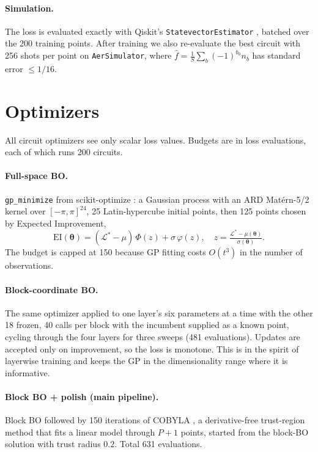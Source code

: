 \documentclass[10pt,twocolumn]{article}
\newcommand{\btheta}{\bm{\theta}}
\begin{document}
\paragraph{Simulation.} The loss is evaluated exactly with Qiskit's
\texttt{StatevectorEstimator} \citep{qiskit2024}, batched over the 200 training
points. After training we also re-evaluate the best circuit with 256 shots per
point on \texttt{AerSimulator}, where $\hat f=\frac1S\sum_b(-1)^{b_0}n_b$ has
standard error $\le 1/16$.

\section{Optimizers}

All circuit optimizers see only scalar loss values. Budgets are in loss
evaluations, each of which runs 200 circuits.

\paragraph{Full-space BO.} \texttt{gp\_minimize} from scikit-optimize
\citep{skopt}: a Gaussian process with an ARD Mat\'ern-5/2 kernel over
$[-\pi,\pi]^{24}$, 25 Latin-hypercube initial points, then 125 points chosen by
Expected Improvement,
\begin{equation}
\mathrm{EI}(\btheta)=(\mathcal L^*-\mu)\,\Phi(z)+\sigma\,\varphi(z),\quad
z=\tfrac{\mathcal L^*-\mu(\btheta)}{\sigma(\btheta)} .
\end{equation}
The budget is capped at 150 because GP fitting costs $O(t^3)$ in the number of
observations.

\paragraph{Block-coordinate BO.} The same optimizer applied to one layer's six
parameters at a time with the other 18 frozen, 40 calls per block with the incumbent
supplied as a known point, cycling through the four layers for three sweeps (481
evaluations). Updates are accepted only on improvement, so the loss is monotone.
This is in the spirit of layerwise training \citep{skolik2021layerwise} and keeps
the GP in the dimensionality range where it is informative.

\paragraph{Block BO + polish (main pipeline).} Block BO followed by 150 iterations
of COBYLA \citep{powell1994cobyla}, a derivative-free trust-region method that fits a
linear model through $P{+}1$ points, started from the block-BO solution with trust
radius $0.2$. Total 631 evaluations.
\end{document}

